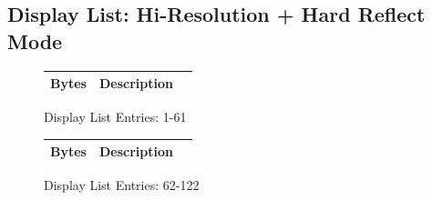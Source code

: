 \subsection*{Display List: Hi-Resolution + Hard Reflect Mode}
\vspace{-0.5cm}
\begin{minipage}[b]{0.31\linewidth}
  \begin{figure}[H]
    {
      \setlength{\tabcolsep}{3.0pt}
      \setlength\cmidrulewidth{\heavyrulewidth} %
      \begin{adjustbox}{height=8.5cm}

        \begin{tabular}{lll}
          \toprule
          Bytes       & Description                                                         \\
          \midrule
          
        \end{tabular}

      \end{adjustbox}

    }\caption*{Display List Entries: 1-61}
  \end{figure}
\end{minipage}
\hspace{0.1cm}
\begin{minipage}[b]{0.31\linewidth}
  \begin{figure}[H]
    {
      \setlength{\tabcolsep}{3.0pt}
      \setlength\cmidrulewidth{\heavyrulewidth} %
      \begin{adjustbox}{height=8.5cm}

        \begin{tabular}{lll}
          \toprule
          Bytes       & Description                                                         \\
          \midrule
        \end{tabular}

      \end{adjustbox}

    }\caption*{Display List Entries: 62-122}
  \end{figure}
\end{minipage}
\hspace{0.1cm}

